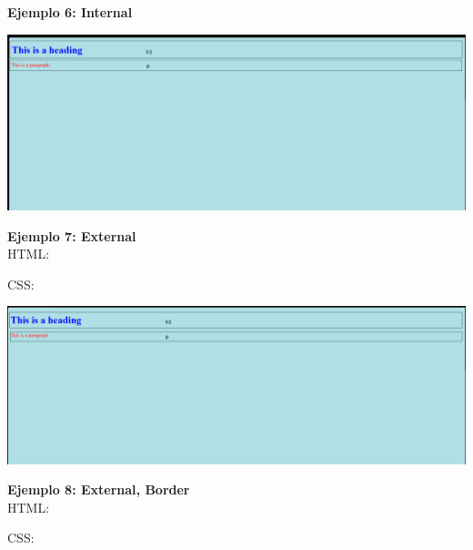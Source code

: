 \documentclass[11pt]{scrartcl}
\begin{document}
\textbf{Ejemplo 6: Internal}


\begin{center}
    \includegraphics[scale=0.4]{Ex6.png}
\end{center}



\textbf{Ejemplo 7: External} \\

HTML:




CSS:



\begin{center}
    \includegraphics[scale=0.4]{Ex7.png}
\end{center}


\textbf{Ejemplo 8: External, Border} \\

HTML:




CSS:

\end{document}
